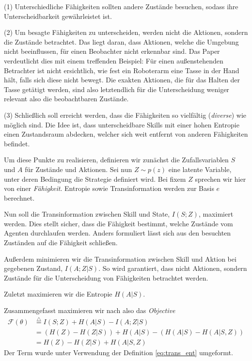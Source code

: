 \smallspace

(1) Unterschiedliche Fähigkeiten sollten andere Zustände besuchen, sodass ihre Unterscheidbarkeit gewährleistet ist.

(2) Um besagte Fähigkeiten zu unterscheiden, werden nicht die Aktionen, sondern die Zustände betrachtet. Das liegt daran, dass Aktionen, welche die Umgebung nicht beeinflussen, für einen Beobachter nicht erkennbar sind. Das Paper verdeutlicht dies mit einem treffenden Beispiel: Für einen außenstehenden Betrachter ist nicht ersichtlich, wie fest ein Roboterarm eine Tasse in der Hand hält, falls sich diese nicht bewegt. Die exakten Aktionen, die für das Halten der Tasse getätigt werden, sind also letztendlich für die Unterscheidung weniger relevant also die beobachtbaren Zustände.

(3) Schließlich soll erreicht werden, dass die Fähigkeiten so vielfältig (\textit{diverse}) wie möglich sind. Die Idee ist, dass unterscheidbare Skills mit einer hohen Entropie einen Zustandsraum abdecken, welcher sich weit entfernt von anderen Fähigkeiten befindet.

\smallspace

Um diese Punkte zu realisieren, definieren wir zunächst die Zufallsvariablen $ S $ und $ A $ für Zustände und Aktionen. Sei nun $ Z \sim p(z) $ eine latente Variable, unter deren Bedingung die Strategie definiert wird. Bei fixem $ Z $ sprechen wir hier von einer \textit{Fähigkeit}. Entropie sowie Transinformation werden zur Basis $ e $ berechnet.

Nun soll die Transinformation zwischen Skill und State, $ I(S;Z) $, maximiert werden. Dies stellt sicher, dass die Fähigkeit bestimmt, welche Zustände vom Agenten durchlaufen werden. Anders formuliert lässt sich aus den besuchten Zuständen auf die Fähigkeit schließen.

Außerdem minimieren wir die Transinformation zwischen Skill und Aktion bei gegebenen Zustand, $ I(A; Z | S) $. So wird garantiert, dass nicht Aktionen, sondern Zustände für die Unterscheidung von Fähigkeiten betrachtet werden.

Zuletzt maximieren wir die Entropie $ H(A|S) $.

\smallspace

Zusammengefasst maximieren wir nach \cite{diversity_eysenbach} also das \textit{Objective}
\begin{align}
    \mathcal{F}(\theta) &\stackrel{\triangle}{=} I(S;Z) + H(A|S) - I(A;Z|S) \label{eq:objective_1}\\
    & = (H(Z) - H(Z|S)) + H(A|S) - (H(A|S) - H(A|S,Z)) \nonumber\\
    & = H(Z) - H(Z|S) + H(A|S,Z) \label{eq:objective_intuitive}
\end{align}
Der Term wurde unter Verwendung der Definition \eqref{eq:trans_ent} umgeformt.

